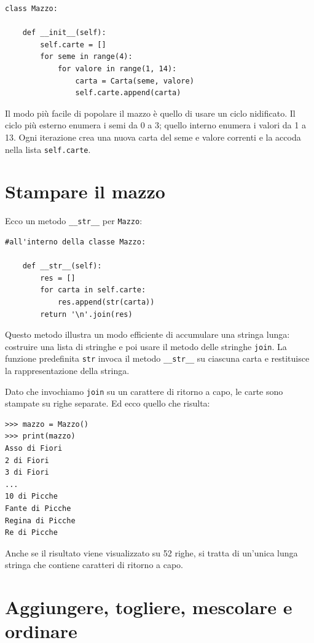 \documentclass[10pt]{book}
\begin{document}
\begin{verbatim}
class Mazzo:

    def __init__(self):
        self.carte = []
        for seme in range(4):
            for valore in range(1, 14):
                carta = Carta(seme, valore)
                self.carte.append(carta)
\end{verbatim}
%
Il modo più facile di popolare il mazzo è quello di usare un ciclo nidificato. Il ciclo più esterno enumera i semi da 0 a 3; quello interno enumera i valori da 1 a 13. Ogni iterazione crea una nuova carta del seme e valore correnti e la accoda nella lista  {\tt self.carte}.


\section{Stampare il mazzo}
\label{printdeck}

Ecco un metodo \verb"__str__" per {\tt Mazzo}:

\begin{verbatim}
#all'interno della classe Mazzo:

    def __str__(self):
        res = []
        for carta in self.carte:
            res.append(str(carta))
        return '\n'.join(res)
\end{verbatim}
%
Questo metodo illustra un modo efficiente di accumulare una stringa lunga: costruire una lista di stringhe e poi usare il metodo delle stringhe {\tt join}.
La funzione predefinita {\tt str} invoca il metodo \verb"__str__"
su ciascuna carta e restituisce la rappresentazione della stringa.

Dato che invochiamo {\tt join} su un carattere di ritorno a capo, le carte sono stampate su righe separate. Ed ecco quello che risulta:

\begin{verbatim}
>>> mazzo = Mazzo()
>>> print(mazzo)
Asso di Fiori
2 di Fiori
3 di Fiori
...
10 di Picche
Fante di Picche
Regina di Picche
Re di Picche
\end{verbatim}
%
Anche se il risultato viene visualizzato su 52 righe, si tratta di un'unica lunga stringa che contiene caratteri di ritorno a capo.


\section{Aggiungere, togliere, mescolare e ordinare}
\end{document}
